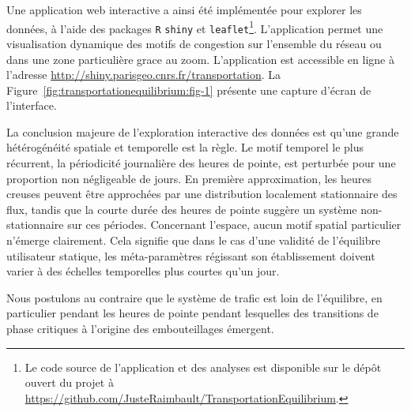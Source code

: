 {Une application web interactive a ainsi été implémentée pour explorer les données, à l'aide des packages \texttt{R} \texttt{shiny} et \texttt{leaflet}\footnote{Le code source de l'application et des analyses est disponible sur le dépôt ouvert du projet à \url{https://github.com/JusteRaimbault/TransportationEquilibrium}.}. L'application permet une visualisation dynamique des motifs de congestion sur l'ensemble du réseau ou dans une zone particulière grace au zoom. L'application est accessible en ligne à l'adresse \url{http://shiny.parisgeo.cnrs.fr/transportation}. La Figure~\ref{fig:transportationequilibrium:fig-1} présente une capture d'écran de l'interface.

La conclusion majeure de l'exploration interactive des données est qu'une grande hétérogénéité spatiale et temporelle est la règle. Le motif temporel le plus récurrent, la périodicité journalière des heures de pointe, est perturbée pour une proportion non négligeable de jours. En première approximation, les heures creuses peuvent être approchées par une distribution localement stationnaire des flux, tandis que la courte durée des heures de pointe suggère un système non-stationnaire sur ces périodes. Concernant l'espace, aucun motif spatial particulier n'émerge clairement. Cela signifie que dans le cas d'une validité de l'équilibre utilisateur statique, les méta-paramètres régissant son établissement doivent varier à des échelles temporelles plus courtes qu'un jour.

Nous postulons au contraire que le système de trafic est loin de l'équilibre, en particulier pendant les heures de pointe pendant lesquelles des transitions de phase critiques à l'origine des embouteillages émergent.
}
 


